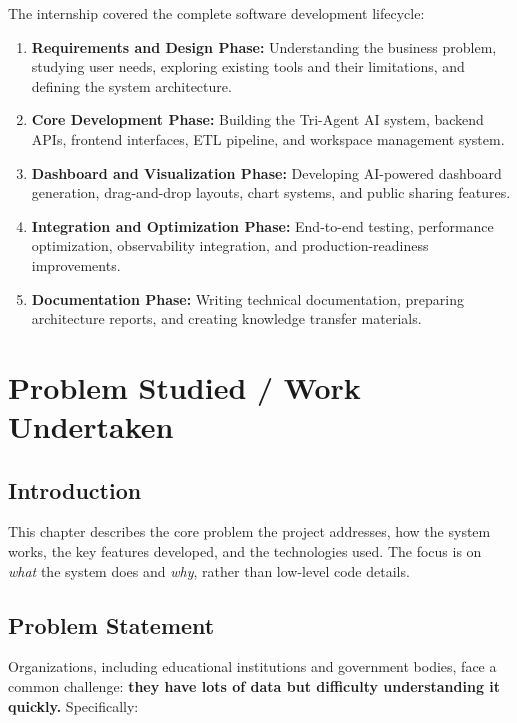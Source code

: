 \documentclass[12pt,a4paper]{report}
\begin{document}
The internship covered the complete software development lifecycle:

\begin{enumerate}[leftmargin=1.5cm]
    \item \textbf{Requirements and Design Phase:} Understanding the business problem, studying user needs, exploring existing tools and their limitations, and defining the system architecture.
    \item \textbf{Core Development Phase:} Building the Tri-Agent AI system, backend APIs, frontend interfaces, ETL pipeline, and workspace management system.
    \item \textbf{Dashboard and Visualization Phase:} Developing AI-powered dashboard generation, drag-and-drop layouts, chart systems, and public sharing features.
    \item \textbf{Integration and Optimization Phase:} End-to-end testing, performance optimization, observability integration, and production-readiness improvements.
    \item \textbf{Documentation Phase:} Writing technical documentation, preparing architecture reports, and creating knowledge transfer materials.
\end{enumerate}

\chapter{Problem Studied / Work Undertaken}

\section{Introduction}

This chapter describes the core problem the project addresses, how the system works, the key features developed, and the technologies used. The focus is on \textit{what} the system does and \textit{why}, rather than low-level code details.

\section{Problem Statement}

Organizations, including educational institutions and government bodies, face a common challenge: \textbf{they have lots of data but difficulty understanding it quickly.} Specifically:
\end{document}
